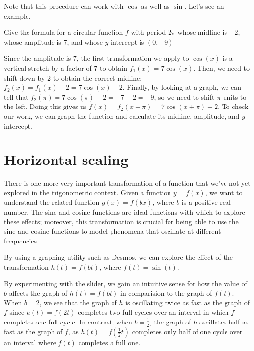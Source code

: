 \documentclass{ximera}
\begin{document}
Note that this procedure can work with $\cos$ as well as $\sin$. Let's see an example.

\begin{example}
Give the formula for a circular function $f$ with period $2\pi$ whose midline is $-2$, whose amplitude is 7, and whose $y$-intercept is $(0, -9)$
\begin{explanation}
Since the amplitude is 7, the first transformation we apply to $\cos(x)$ is a vertical stretch by a factor of 7 to obtain $f_1(x) = 7\cos(x)$. Then, we need to shift down by 2 to obtain the correct midline: $f_2(x) = f_1(x) - 2 = 7\cos(x) - 2$. Finally, by looking at a graph, we can tell that $f_2(\pi) = 7\cos(\pi) - 2 = -7 - 2 = -9$, so we need to shift $\pi$ units to the left. Doing this gives us $f(x) = f_2(x + \pi) = 7\cos(x + \pi) - 2$. To check our work, we can graph the function and calculate its midline, amplitude, and $y$-intercept. 
\end{explanation}
\end{example} 

%
%
%

\section{Horizontal scaling}

There is one more very important transformation of a function that we've not yet explored in the trigonometric context.  Given a function \(y = f(x)\), we want to understand the related function \(g(x) = f(bx)\), where \(b\) is a positive real number.  The sine and cosine functions are ideal functions with which to explore these effects; moreover, this transformation is crucial for being able to use the sine and cosine functions to model phenomena that oscillate at different frequencies.%

By using a graphing utility such as Desmos, we can explore the effect of the transformation \(h(t) = f(bt)\), where \(f(t) = \sin(t)\).%

\begin{center}  
\end{center}

By experimenting with the slider, we gain an intuitive sense for how the value of \(b\) affects the graph of \(h(t) = f(bt)\) in comparision to the graph of \(f(t)\).  When \(b = 2\), we see that the graph of \(h\) is oscillating twice as fast as the graph of \(f\) since \(h(t) = f(2t)\) completes two full cycles over an interval in which \(f\) completes one full cycle.  In contrast, when \(b = \frac{1}{2}\), the graph of \(h\) oscillates half as fast as the graph of \(f\), as \(h(t) = f(\frac{1}{2}t)\) completes only half of one cycle over an interval where \(f(t)\) completes a full one.%
\end{document}
